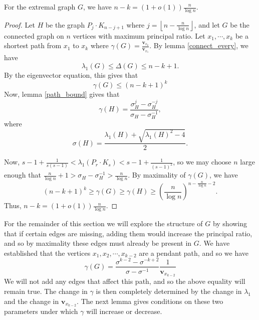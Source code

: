 \begin{lemma}\label{s_range}
For the extremal graph $G$, we have $n-k = (1+o(1))\frac{n}{\log n}$.
\end{lemma}
\begin{proof}
Let $H$ be the graph $P_j \cdot K_{n-j+1}$ where $ j = \left\lfloor n - \frac{n}{\log n}\right\rfloor$, and let $G$ be the connected graph on $n$ vertices with maximum principal ratio. Let $x_1,\cdots, x_k$ be a shortest path from $x_1$ to $x_k$ where $\gamma(G) = \frac{\mathbf{v}_{x_k}}{\mathbf{v}_{x_1}}$. By lemma \ref{connect_every}, we have
\[
\lambda_1(G) \leq \Delta(G) \leq n-k+1.
\]
By the eigenvector equation, this gives that
\begin{equation}\label{gamma of G}
\gamma(G) \leq (n-k+1)^k
\end{equation}
Now, lemma \ref{path_bound} gives that
\[
\gamma(H)  = \frac{\sigma_H^j - \sigma_H^{-j}}{\sigma_H - \sigma_H^{-1}},
\]
where
\[
\sigma(H) = \frac{\lambda_1(H) + \sqrt{\lambda_1(H)^2 -4}}{2}.
\]

Now, $s-1 + \frac{1}{s(s-1)} < \lambda_1(P_r\cdot K_s) < s-1 + \frac{1}{(s-1)^2}$, so we may choose $n$ large enough that $\frac{n}{\log n} + 1 >\sigma_H - \sigma_H^{-1} > \frac{n}{\log n}$. By maximality of $\gamma(G)$, we have
\[
(n-k+1)^k \geq \gamma(G) \geq \gamma(H) \geq \left(\frac{n}{\log n}\right)^{n-\frac{n}{\log n} - 2}.
\]
Thus, $n- k = (1+o(1))\frac{n}{\log n}$.
\end{proof}

For the remainder of this section we will explore the structure of $G$ by
showing that if certain edges are missing, adding them would increase
the principal ratio, and so by maximality these edges must already be
present in $G$.  We have established that the vertices $x_1, x_2, \cdots, x_{k-2}$
are a pendant path, and so we have
\begin{equation}\label{pr_form}
 \gamma(G) = \frac{\sigma^{k-2} - \sigma^{-k+2}}{\sigma-\sigma^{-1}} \frac{1}{\mathbf{v}_{x_{k-2}}}
\end{equation}
We will not add any edges that affect this path, and so the above equality will
remain true.   
The change in $\gamma$ is then completely determined by the change
in $\lambda_1$ and the change in $\mathbf{v}_{x_{k-2}}$.  The next lemma gives conditions
on these two parameters under which $\gamma$ will increase or decrease.

